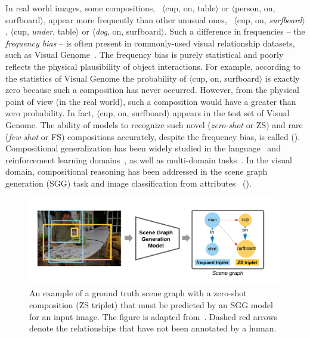 In real world images, some compositions, \eg~$\langle$cup, on, table$\rangle$ or $\langle$person, on, surfboard$\rangle$, appear more frequently than other unusual ones, \eg~$\langle$cup, on, \textit{surfboard}$\rangle$, $\langle$cup, \textit{under}, table$\rangle$ or $\langle$\textit{dog}, on, surfboard$\rangle$. %
Such a difference in frequencies -- the \textit{frequency bias} -- is often present in commonly-used visual relationship datasets, such as Visual Genome~\citep{krishna2017visual}.
The frequency bias is purely statistical and poorly reflects the physical plausibility of object interactions. For example, according to the statistics of Visual Genome the probability of $\langle$cup, on, {surfboard}$\rangle$ is exactly zero because such a composition has never occurred. However, from the physical point of view (in the real world), such a composition would have a greater than zero probability. In fact, $\langle$cup, on, {surfboard}$\rangle$ appears in the test set of Visual Genome.
The ability of models to recognize such novel (\textit{zero-shot} or ZS) and rare (\textit{few-shot} or FS) compositions accurately, despite the frequency bias, is called \textit{\cg} (\cgshort). 
Compositional generalization has been widely studied in the language~\citep{atzmon2016learning, keysers2019measuring, lake2019compositional} and reinforcement learning domains~\citep{jiang2019language,cogswell2019emergence,kipf2019compile}, as well as multi-domain tasks~\citep{johnson2017clevr,bahdanau2018systematic,bahdanau2019closure,agrawal2017c,agrawal2018don}.
In the visual domain, compositional reasoning has been addressed in the scene graph generation (SGG) task and image classification from attributes~\citep{lampert2013attribute,demirel2017attributes2classname,naeem2021learning} (\fig{\ref{fig:zeroshots}}).

\begin{figure}[thbp]
	\centering
	\includegraphics[width=0.99\textwidth,align=c,trim={0 0cm 0cm 0cm},clip]{figs/zeroshots.pdf}
	\vspace{-15pt}
	\caption{\small An example of a ground truth scene graph with a zero-shot composition (ZS triplet) that must be predicted by an SGG model for an input image. The figure is adapted from~\citep{knyazev2020graph}. Dashed red arrows denote the relationships that have not been annotated by a human.}
	\label{fig:zeroshots}
\end{figure}

